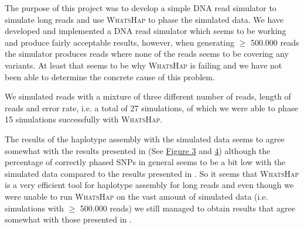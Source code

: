 \documentclass[10pt,a4paper]{article}
\begin{document}
The purpose of this project was to develop a simple DNA read simulator to simulate long reads and use \textsc{WhatsHap} to phase the simulated data. We have developed and implemented a DNA read simulator which seems to be working and produce fairly acceptable results, however, when generating $\geq$ 500.000 reads the simulator produces reads where none of the reads seems to be covering any variants. At least that seems to be why \textsc{WhatsHap} is failing and we have not been able to determine the concrete cause of this problem.

We simulated reads with a mixture of three different number of reads, length of reads and error rate, i.e. a total of 27 simulations, of which we were able to phase 15 simulations successfully with \textsc{WhatsHap}.

The results of the haplotype assembly with the simulated data seems to agree somewhat with the results presented in \cite{whatshap} (See \hyperref[fig:unphasable100k]{Figure 3} and \hyperref[fig:unphasable500k]{4}) although the percentage of correctly phased SNPs in general seems to be a bit low with the simulated data compared to the results presented in \cite{whatshap}. So it seems that \textsc{WhatsHap} is a very efficient tool for haplotype assembly for long reads and even though we were unable to run \textsc{WhatsHap} on the vast amount of simulated data (i.e. simulations with $\geq$ 500.000 reads) we still managed to obtain results that agree somewhat with those presented in \cite{whatshap}.

\newpage
{}
{}

\newpage
\appendix
\end{document}
